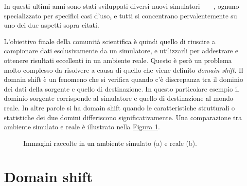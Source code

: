 \documentclass[12pt]{report}
\begin{document}
In questi ultimi anni sono stati sviluppati diversi nuovi simulatori~\cite{kolve2022ai2thorinteractive3denvironment}~\cite{NEURIPS2021_021bbc7e}~\cite{urakami2022doorgymscalabledooropening}~\cite{1389727}, ognuno specializzato per specifici casi d'uso, e tutti si concentrano pervalentemente su uno dei due aspetti sopra citati.

L'obiettivo finale della comunità scientifica è quindi quello di riuscire a campionare dati esclusivamente da un simulatore, e utilizzarli per addestrare e ottenere risultati eccellenti in un ambiente reale. Questo è però un problema molto complesso da risolvere a causa di quello che viene definito \textit{domain shift}. Il domain shift è un fenomeno che si verifica quando c'è discrepanza tra il dominio dei dati della sorgente e quello di destinazione. In questo particolare esempio il dominio sorgente corrisponde al simulatore e quello di destinazione al mondo reale. In altre parole si ha domain shift quando le caratteristiche strutturali o statistiche dei due domini differiscono significativamente. Una comparazione tra ambiente simulato e reale è illustrato nella \hyperref[fig:immagine-simulata-reale]{Figura \ref{fig:immagine-simulata-reale}}.


\begin{figure}[t]
	\centering
	\hspace{0.01\textwidth}
	\caption{Immagini raccolte in un ambiente simulato (a) e reale (b).}
	\label{fig:immagine-simulata-reale}
\end{figure}

\section{Domain shift}
\label{sec:domain_shift}
\end{document}
